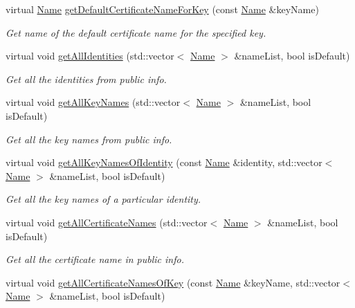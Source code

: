 \begin{DoxyCompactItemize}
virtual \hyperlink{classndn_1_1Name}{Name} \hyperlink{classndn_1_1SecPublicInfoSqlite3_ab13497d92558d0a5f707b069426c304f}{get\+Default\+Certificate\+Name\+For\+Key} (const \hyperlink{classndn_1_1Name}{Name} \&key\+Name)
\begin{DoxyCompactList}\small\item\em Get name of the default certificate name for the specified key. \end{DoxyCompactList}\item 
virtual void \hyperlink{classndn_1_1SecPublicInfoSqlite3_ab1b2a1a8ad54a4a21c5ee60f6bd64d8c}{get\+All\+Identities} (std\+::vector$<$ \hyperlink{classndn_1_1Name}{Name} $>$ \&name\+List, bool is\+Default)
\begin{DoxyCompactList}\small\item\em Get all the identities from public info. \end{DoxyCompactList}\item 
virtual void \hyperlink{classndn_1_1SecPublicInfoSqlite3_aaba27e940d0f9f35c377b6dd7d4c7247}{get\+All\+Key\+Names} (std\+::vector$<$ \hyperlink{classndn_1_1Name}{Name} $>$ \&name\+List, bool is\+Default)
\begin{DoxyCompactList}\small\item\em Get all the key names from public info. \end{DoxyCompactList}\item 
virtual void \hyperlink{classndn_1_1SecPublicInfoSqlite3_ab01f94a4d740a3ef6e3d0e208cfe9fdb}{get\+All\+Key\+Names\+Of\+Identity} (const \hyperlink{classndn_1_1Name}{Name} \&identity, std\+::vector$<$ \hyperlink{classndn_1_1Name}{Name} $>$ \&name\+List, bool is\+Default)
\begin{DoxyCompactList}\small\item\em Get all the key names of a particular identity. \end{DoxyCompactList}\item 
virtual void \hyperlink{classndn_1_1SecPublicInfoSqlite3_af57053771680e2010112a992a7341580}{get\+All\+Certificate\+Names} (std\+::vector$<$ \hyperlink{classndn_1_1Name}{Name} $>$ \&name\+List, bool is\+Default)
\begin{DoxyCompactList}\small\item\em Get all the certificate name in public info. \end{DoxyCompactList}\item 
virtual void \hyperlink{classndn_1_1SecPublicInfoSqlite3_a72c41faf166f90e280fb8bcd76306086}{get\+All\+Certificate\+Names\+Of\+Key} (const \hyperlink{classndn_1_1Name}{Name} \&key\+Name, std\+::vector$<$ \hyperlink{classndn_1_1Name}{Name} $>$ \&name\+List, bool is\+Default)

\end{DoxyCompactItemize}
